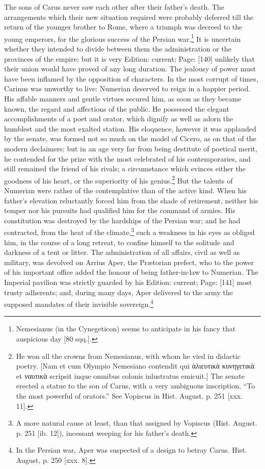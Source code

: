 The sons of Carus never saw each other after their father\texthebrew{}’s death. The arrangements which their new situation required were probably deferred till the return of the younger brother to Rome, where a triumph was decreed to the young emperors, for the glorious success of the Persian war.\footnote{Nemesianus (in the Cynegeticon) seems to anticipate in his fancy that auspicious day [80 sqq.].} It is uncertain whether they intended to divide between them the administration or the provinces of the empire; but it is very Edition: current; Page: [140] unlikely that their union would have proved of any long duration. The jealousy of power must have been inflamed by the opposition of characters. In the most corrupt of times, Carinus was unworthy to live: Numerian deserved to reign in a happier period. His affable manners and gentle virtues secured him, as soon as they became known, the regard and affections of the public. He possessed the elegant accomplishments of a poet and orator, which dignify as well as adorn the humblest and the most exalted station. His eloquence, however it was applauded by the senate, was formed not so much on the model of Cicero, as on that of the modern declaimers; but in an age very far from being destitute of poetical merit, he contended for the prize with the most celebrated of his contemporaries, and still remained the friend of his rivals; a circumstance which evinces either the goodness of his heart, or the superiority of his genius.\footnote{He won all the crowns from Nemesianus, with whom he vied in didactic poetry. [Nam et cum Olympio Nemesiano contendit qui \textgreek{\texthebrew{ἁ}λιευτικ\texthebrew{ὰ} κυνηγετικ\texthebrew{ὰ}} et \textgreek{ναυτικ\texthebrew{ὰ}} scripsit inque omnibus colonis inlustratus emicuit.] The senate erected a statue to the son of Carus, with a very ambiguous inscription, \texthebrew{“}To the most powerful of orators.\texthebrew{}” See Vopiscus in Hist. August. p. 251 [xxx. 11].} But the talents of Numerian were rather of the contemplative than of the active kind. When his father\texthebrew{}’s elevation reluctantly forced him from the shade of retirement, neither his temper nor his pursuits had qualified him for the command of armies. His constitution was destroyed by the hardships of the Persian war; and he had contracted, from the heat of the climate,\footnote{A more natural cause at least, than that assigned by Vopiscus (Hist. August. p. 251 [ib. 12]), incessant weeping for his father\texthebrew{}’s death.} such a weakness in his eyes as obliged him, in the course of a long retreat, to confine himself to the solitude and darkness of a tent or litter. The administration of all affairs, civil as well as military, was devolved on Arrius Aper, the Prætorian prefect, who to the power of his important office added the honour of being father-in-law to Numerian. The Imperial pavilion was strictly guarded by his Edition: current; Page: [141] most trusty adherents; and, during many days, Aper delivered to the army the supposed mandates of their invisible sovereign.\footnote{In the Persian war, Aper was suspected of a design to betray Carus. Hist. August, p. 250 [xxx. 8].}

